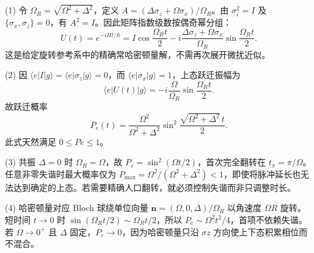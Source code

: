 (1) 令 \(\Omega_R=\sqrt{\Omega^2+\Delta^2}\)，定义 \(A=(\Delta\sigma_z+\Omega\sigma_x)/\Omega_R\)。由 \(\sigma_i^2=I\) 及 \(\{\sigma_x,\sigma_z\}=0\)，有 \(A^2=I\)。因此矩阵指数级数按偶奇幂分组：
\[
U(t)=e^{-iHt/\hbar}
=I\cos\frac{\Omega_Rt}{2}
-i\frac{\Delta\sigma_z+\Omega\sigma_x}{\Omega_R}
\sin\frac{\Omega_Rt}{2}.
\]
这是给定旋转参考系中的精确常哈密顿量解，不需再次展开微扰近似。

(2) 因 \(\langle e|I|g\rangle=\langle e|\sigma_z|g\rangle=0\)，而 \(\langle e|\sigma_x|g\rangle=1\)，上态跃迁振幅为
\[
\langle e|U(t)|g\rangle
=-i\frac{\Omega}{\Omega_R}\sin\frac{\Omega_Rt}{2}.
\]
故跃迁概率
\[
P_e(t)=\frac{\Omega^2}{\Omega^2+\Delta^2}
\sin^2\frac{\sqrt{\Omega^2+\Delta^2}\,t}{2}.
\]
此式天然满足 \(0\le Pe\le 1\)。

(3) 共振 \(\Delta =0\) 时 \(\Omega_R=\Omega\)，故 \(P_e=\sin^2(\Omega t/2)\)，首次完全翻转在 \(t_\pi=\pi/\Omega\)。任意非零失谐时最大概率仅为 \(P_{\max}=\Omega^2/(\Omega^2+\Delta^2)<1\)，即使将脉冲延长也无法达到确定的上态。若需要精确人口翻转，就必须控制失谐而非只调整时长。

(4) 哈密顿量对应 Bloch 球绕单位向量 \(\boldsymbol n=(\Omega,0,\Delta)/\Omega_R\) 以角速度 \(\Omega R\) 旋转。短时间 \(t\to0\) 时 \(\sin(\Omega_Rt/2)\sim\Omega_Rt/2\)，所以 \(P_e\sim \Omega^2t^2/4\)，首项不依赖失谐。若 \(\Omega \to 0^{+}\) 且 \(\Delta \) 固定，\(P_e\to0\)，因为哈密顿量只沿 \(\sigma z\) 方向使上下态积累相位而不混合。
